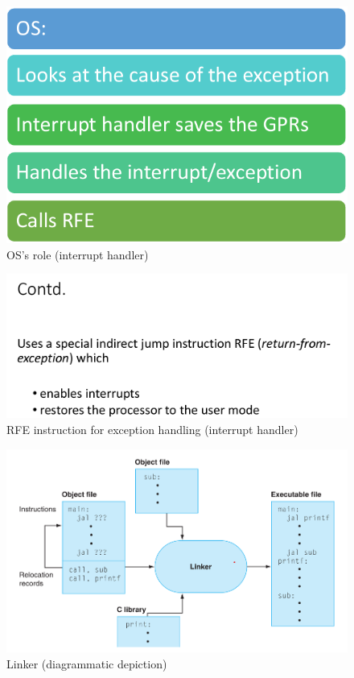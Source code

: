 \documentclass{scrartcl}
\begin{document}
\begin{figure}[h]
\centering
\includegraphics[scale=0.5]{Images/interrupt_handler_3.png}
\caption{OS's role (interrupt handler)}
\end{figure}

\begin{figure}[h]
\centering
\includegraphics[scale=0.5]{Images/interrupt_handler_4.png}
\caption{RFE instruction for exception handling (interrupt handler)}
\end{figure}

\begin{figure}[h]
\centering
\includegraphics[scale=0.5]{Images/linker.png}
\caption{Linker (diagrammatic depiction)}
\end{figure}
\end{document}
